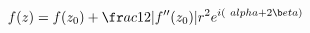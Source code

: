 \documentclass[preview]{standalone}
\begin{document}
\begin{align*}
f(z)=f(z_0) + \fr a c{1}{ 2 }|f''(z_0)|r^ 2   e ^{i(\ a l p h a + 2 \b e t a )}
\end{align*}
\end{document}
